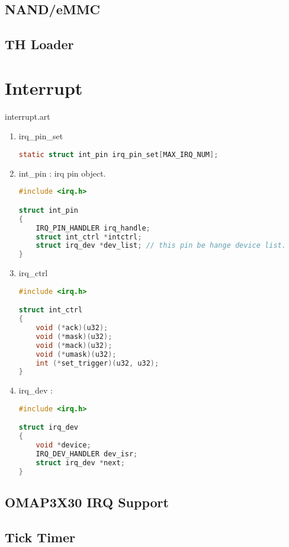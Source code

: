 \documentclass[a4paper,11pt]{book}
\begin{document}
\section{NAND/eMMC}

\section{TH Loader}

\chapter{Interrupt}
 {interrupt.art}

\begin{enumerate}
\item irq\_pin\_set
\begin{lstlisting}[language=c, numbers=none]
	static struct int_pin irq_pin_set[MAX_IRQ_NUM];
\end{lstlisting}

\item int\_pin : irq pin object.
\begin{lstlisting}[language=c, numbers=none]
#include <irq.h>

struct int_pin
{
	IRQ_PIN_HANDLER irq_handle;
	struct int_ctrl *intctrl;
	struct irq_dev *dev_list; // this pin be hange device list.
}
\end{lstlisting}

\item irq\_ctrl
\begin{lstlisting}[language=c, numbers=none]
#include <irq.h>

struct int_ctrl
{
	void (*ack)(u32);
	void (*mask)(u32);
	void (*mack)(u32);
	void (*umask)(u32);
	int (*set_trigger)(u32, u32);
}
\end{lstlisting}

\item irq\_dev :
\begin{lstlisting}[language=c, numbers=none]
#include <irq.h>

struct irq_dev
{
	void *device;
	IRQ_DEV_HANDLER dev_isr;
	struct irq_dev *next;
}
\end{lstlisting}
\end{enumerate}

\section{OMAP3X30 IRQ Support}

\section{Tick Timer}
\end{document}
